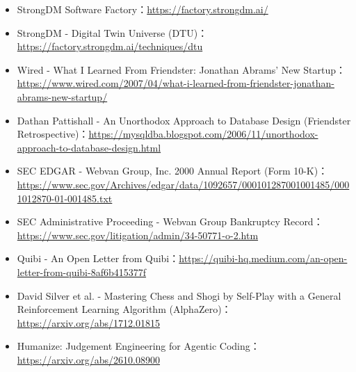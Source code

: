 \documentclass[UTF8,a4paper,11pt,fontset=fandol]{ctexart}
\begin{document}
\begin{itemize}
\item StrongDM Software Factory：\url{https://factory.strongdm.ai/}

\item StrongDM - Digital Twin Universe (DTU)：\url{https://factory.strongdm.ai/techniques/dtu}

\item Wired - What I Learned From Friendster: Jonathan Abrams' New Startup：\url{https://www.wired.com/2007/04/what-i-learned-from-friendster-jonathan-abrams-new-startup/}

\item Dathan Pattishall - An Unorthodox Approach to Database Design (Friendster Retrospective)：\url{https://mysqldba.blogspot.com/2006/11/unorthodox-approach-to-database-design.html}

\item SEC EDGAR - Webvan Group, Inc. 2000 Annual Report (Form 10-K)：\url{https://www.sec.gov/Archives/edgar/data/1092657/000101287001001485/0001012870-01-001485.txt}

\item SEC Administrative Proceeding - Webvan Group Bankruptcy Record：\url{https://www.sec.gov/litigation/admin/34-50771-o-2.htm}

\item Quibi - An Open Letter from Quibi：\url{https://quibi-hq.medium.com/an-open-letter-from-quibi-8af6b415377f}

\item David Silver et al. - Mastering Chess and Shogi by Self-Play with a General Reinforcement Learning Algorithm (AlphaZero)：\url{https://arxiv.org/abs/1712.01815}

\item Humanize: Judgement Engineering for Agentic Coding：\url{https://arxiv.org/abs/2610.08900}

\end{itemize}
\end{document}
